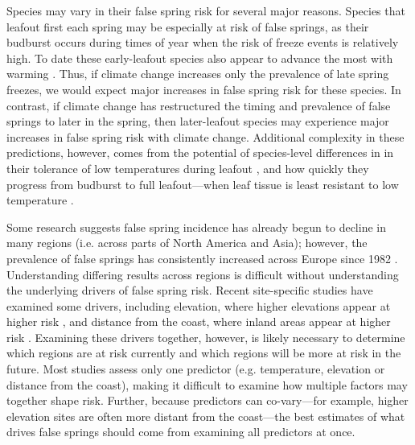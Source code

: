 \documentclass{article}\usepackage[]{graphicx}\usepackage[]{color}
\begin{document}
Species may vary in their false spring risk for several major reasons. Species that leafout first each spring may be especially at risk of false springs, as their budburst occurs during times of year when the risk of freeze events is relatively high. To date these early-leafout species also appear to advance the most with warming  \citep{Wolkovich2012}. Thus, if climate change increases only the prevalence of late spring freezes, we would expect major increases in false spring risk for these species. In contrast, if climate change has restructured the timing and prevalence of false springs to later in the spring, then later-leafout species may experience major increases in false spring risk with climate change. Additional complexity in these predictions, however, comes from the potential of species-level differences in in their tolerance of low temperatures during leafout \citep{Lenz2013}, and how quickly they progress from budburst to full leafout---when leaf tissue is least resistant to low temperature \citep{Augspurger2009,Lenz2013,Muffler2016,Zohner2020}.

Some research suggests false spring incidence has already begun to decline in many regions (i.e. across parts of North America and Asia); however, the prevalence of false springs has consistently increased across Europe since 1982 \citep{Liu2018}. Understanding differing results across regions is difficult without understanding the underlying drivers of false spring risk. Recent site-specific studies have examined some drivers, including elevation, where higher elevations appear at higher risk \citep{ Vitra2017,Ma2018, Vitasse2018}, and distance from the coast, where inland areas appear at higher risk \citep{Wypych2016a,Ma2018}. Examining these drivers together, however, is likely necessary to determine which regions are at risk currently and which regions will be more at risk in the future. Most studies assess only one predictor (e.g. temperature, elevation or distance from the coast), making it difficult to examine how multiple factors may together shape risk. Further, because predictors can co-vary---for example, higher elevation sites are often more distant from the coast---the best estimates of what drives false springs should come from examining all predictors at once. 
\end{document}
